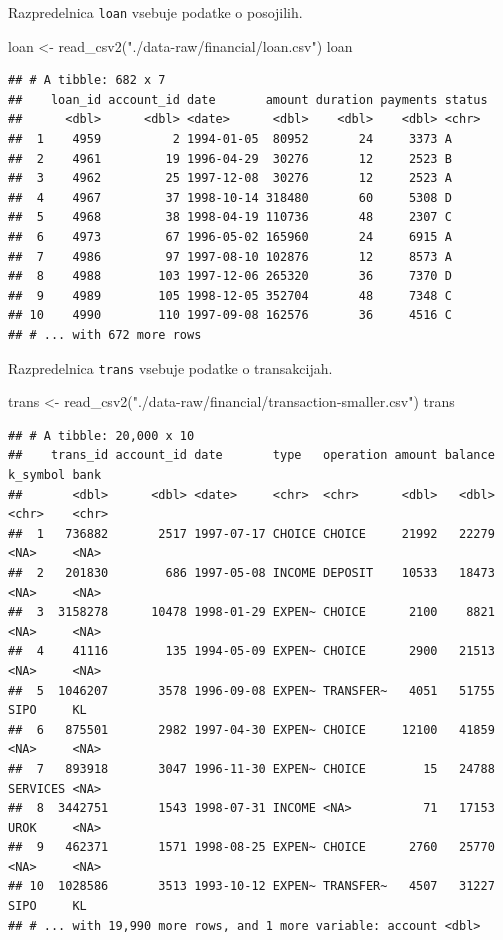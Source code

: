\documentclass[
]{book}
\newenvironment{Shaded}{\begin{snugshade}}{\end{snugshade}}
\newcommand{\FunctionTok}[1]{\textcolor[rgb]{0.00,0.00,0.00}{#1}}
\newcommand{\NormalTok}[1]{#1}
\newcommand{\OtherTok}[1]{\textcolor[rgb]{0.56,0.35,0.01}{#1}}
\newcommand{\StringTok}[1]{\textcolor[rgb]{0.31,0.60,0.02}{#1}}
\begin{document}
Razpredelnica \texttt{loan} vsebuje podatke o posojilih.

\begin{Shaded}
\begin{Highlighting}[]
\NormalTok{loan }\OtherTok{\textless{}{-}} \FunctionTok{read\_csv2}\NormalTok{(}\StringTok{"./data{-}raw/financial/loan.csv"}\NormalTok{)}
\NormalTok{loan}
\end{Highlighting}
\end{Shaded}

\begin{verbatim}
## # A tibble: 682 x 7
##    loan_id account_id date       amount duration payments status
##      <dbl>      <dbl> <date>      <dbl>    <dbl>    <dbl> <chr> 
##  1    4959          2 1994-01-05  80952       24     3373 A     
##  2    4961         19 1996-04-29  30276       12     2523 B     
##  3    4962         25 1997-12-08  30276       12     2523 A     
##  4    4967         37 1998-10-14 318480       60     5308 D     
##  5    4968         38 1998-04-19 110736       48     2307 C     
##  6    4973         67 1996-05-02 165960       24     6915 A     
##  7    4986         97 1997-08-10 102876       12     8573 A     
##  8    4988        103 1997-12-06 265320       36     7370 D     
##  9    4989        105 1998-12-05 352704       48     7348 C     
## 10    4990        110 1997-09-08 162576       36     4516 C     
## # ... with 672 more rows
\end{verbatim}

Razpredelnica \texttt{trans} vsebuje podatke o transakcijah.

\begin{Shaded}
\begin{Highlighting}[]
\NormalTok{trans }\OtherTok{\textless{}{-}} \FunctionTok{read\_csv2}\NormalTok{(}\StringTok{"./data{-}raw/financial/transaction{-}smaller.csv"}\NormalTok{)}
\NormalTok{trans}
\end{Highlighting}
\end{Shaded}

\begin{verbatim}
## # A tibble: 20,000 x 10
##    trans_id account_id date       type   operation amount balance k_symbol bank 
##       <dbl>      <dbl> <date>     <chr>  <chr>      <dbl>   <dbl> <chr>    <chr>
##  1   736882       2517 1997-07-17 CHOICE CHOICE     21992   22279 <NA>     <NA> 
##  2   201830        686 1997-05-08 INCOME DEPOSIT    10533   18473 <NA>     <NA> 
##  3  3158278      10478 1998-01-29 EXPEN~ CHOICE      2100    8821 <NA>     <NA> 
##  4    41116        135 1994-05-09 EXPEN~ CHOICE      2900   21513 <NA>     <NA> 
##  5  1046207       3578 1996-09-08 EXPEN~ TRANSFER~   4051   51755 SIPO     KL   
##  6   875501       2982 1997-04-30 EXPEN~ CHOICE     12100   41859 <NA>     <NA> 
##  7   893918       3047 1996-11-30 EXPEN~ CHOICE        15   24788 SERVICES <NA> 
##  8  3442751       1543 1998-07-31 INCOME <NA>          71   17153 UROK     <NA> 
##  9   462371       1571 1998-08-25 EXPEN~ CHOICE      2760   25770 <NA>     <NA> 
## 10  1028586       3513 1993-10-12 EXPEN~ TRANSFER~   4507   31227 SIPO     KL   
## # ... with 19,990 more rows, and 1 more variable: account <dbl>
\end{verbatim}
\end{document}
